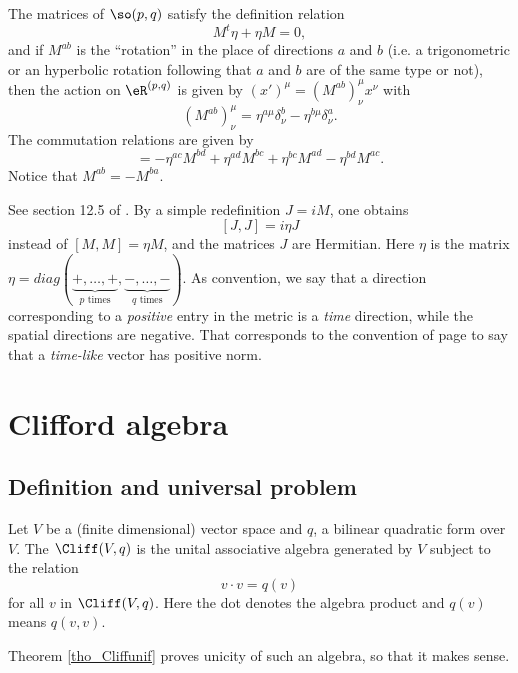 \begin{lemma}		\label{LemCommsopqAlg}
The matrices of $\so(p,q)$ satisfy the definition relation
\begin{equation}
	M^t\eta+\eta M=0,
\end{equation}
and if $M^{ab}$ is the ``rotation'' in the place of directions $a$ and $b$ (i.e. a trigonometric or an hyperbolic rotation following that $a$ and $b$ are of the same type or not), then the action on $\eR^{(p,q)}$ is given by $(x')^{\mu}=(M^{ab})^{\mu}_{\nu}x^{\nu}$ with
\begin{equation}
	(M^{ab})^{\mu}_{\nu}=\eta^{a\mu}\delta^b_{\nu}-\eta^{b\mu}\delta^a_{\nu}.
\end{equation}
The commutation relations are given by
\begin{equation}
	[M^{ab},M^{cd}]=-\eta^{ac}M^{bd}+\eta^{ad}M^{bc}+\eta^{bc}M^{ad}-\eta^{bd}M^{ac}.
\end{equation}
Notice that $M^{ab}=-M^{ba}$. 
\end{lemma}
See section 12.5 of \cite{Schomblond_em}. By a simple redefinition $J=iM$, one obtains 
\begin{equation}			\label{EqJJietaJcomm}
	[J,J]=i\eta J
\end{equation}
instead of $[M,M]=\eta M$, and the matrices $J$ are Hermitian. Here $\eta$ is the matrix $\eta=diag(\underbrace{+,\ldots,+}_{\text{$p$ times}},\underbrace{-,\ldots,-}_{\text{$q$ times}})$. As convention, we say that a direction corresponding to a \emph{positive} entry in the metric is a \emph{time} direction, while the spatial directions are negative. That corresponds to the convention of page \pageref{PgDefsGenre} to say that a \emph{time-like} vector has positive norm.

\section{Clifford algebra}

\subsection{Definition and universal problem}


\begin{definition}
Let $V$ be a (finite dimensional) vector space and $q$, a bilinear quadratic form over $V$. The  $\Cliff(V,q)$ is the unital associative algebra generated by $V$ subject to the relation
\begin{equation}\label{501r1}
       v\cdot v=q(v)
\end{equation}
for all $v$ in $\Cliff(V,q)$. Here the dot denotes the algebra product and $q(v)$ means $q(v,v)$.
\end{definition}
Theorem \ref{tho_Cliffunif} proves unicity of such an algebra, so that it makes sense.


